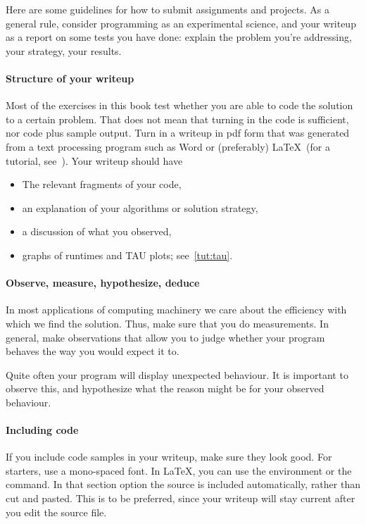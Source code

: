 Here are some guidelines for how to submit assignments and projects.
As a general rule, consider programming as an experimental science,
and your writeup as a report on some tests you have done: explain
the problem you're addressing, your strategy, your results.

\paragraph*{\bf Structure of your writeup}

Most of the exercises in this book test whether you are able to code the solution to a certain
problem. That does not mean that turning in the code is sufficient, nor code plus sample output.
Turn in a writeup in pdf form that was generated from a text processing program such as Word or (preferably)
\LaTeX\ (for a tutorial, see~). Your writeup should have 
\begin{itemize}
\item The relevant fragments of your code,
\item an explanation of your algorithms or solution strategy,
\item a discussion of what you observed,
\item graphs of runtimes and TAU plots; see~\ref{tut:tau}.
\end{itemize}

\paragraph*{Observe, measure, hypothesize, deduce}

In most applications of computing machinery we care about the efficiency with which
we find the solution. Thus, make sure that you do measurements. In general, make
observations that allow you to judge whether your program behaves the way you
would expect it to.

Quite often your program will display unexpected behaviour. It is important to observe
this, and hypothesize what the reason might be for your observed behaviour.

\paragraph*{Including code}

If you include code samples in your writeup, make sure they look good. For starters,
use a mono-spaced font. In \LaTeX, you can use the  environment or the 
 command. In that section option the source is included automatically,
rather than cut and pasted. This is to be preferred, since your writeup will
stay current after you edit the source file.

